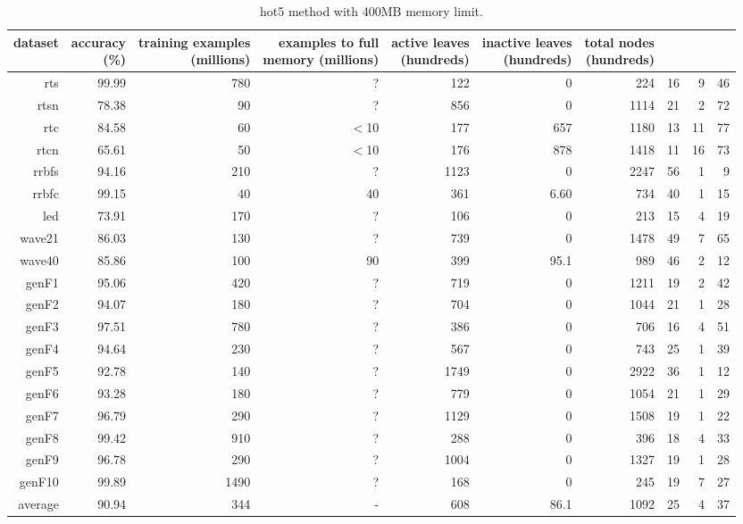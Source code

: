 \clearpage
\begin{table}
\caption{{\sc hot5} method with 400MB memory limit.}
\label{tab:hot5-400MB}
\centering
\begin{tabular}{|r|r|r|r|r|r|r|r|r|r|}
\hline
dataset	&
\rotatebox{90}{\parbox{9em}{accuracy\\(\%)}} &
\rotatebox{90}{\parbox{9em}{training examples\\(millions)}} &
\rotatebox{90}{\parbox{9em}{examples to full\\memory (millions)}} &
\rotatebox{90}{\parbox{9em}{active leaves\\(hundreds)}} &
\rotatebox{90}{\parbox{9em}{inactive leaves\\(hundreds)}} &
\rotatebox{90}{\parbox{9em}{total nodes\\(hundreds)}} &
\rotatebox{90}{\parbox{9em}{tree depth}}	&
\rotatebox{90}{\parbox{9em}{training speed (\%)}} &
\rotatebox{90}{\parbox{9em}{prediction speed (\%)}} \\
\hline
{\sc rts} & 99.99 & 780 & ? & 122 & 0 & 224 & 16 & 9 & 46 \\
{\sc rtsn} & 78.38 & 90 & ? & 856 & 0 & 1114 & 21 & 2 & 72 \\
{\sc rtc} & 84.58 & 60 & $<$10 & 177 & 657 & 1180 & 13 & 11 & 77 \\
{\sc rtcn} & 65.61 & 50 & $<$10 & 176 & 878 & 1418 & 11 & 16 & 73 \\
{\sc rrbfs} & 94.16 & 210 & ? & 1123 & 0 & 2247 & 56 & 1 & 9 \\
{\sc rrbfc} & 99.15 & 40 & 40 & 361 & 6.60 & 734 & 40 & 1 & 15 \\
{\sc led} & 73.91 & 170 & ? & 106 & 0 & 213 & 15 & 4 & 19 \\
{\sc wave21} & 86.03 & 130 & ? & 739 & 0 & 1478 & 49 & 7 & 65 \\
{\sc wave40} & 85.86 & 100 & 90 & 399 & 95.1 & 989 & 46 & 2 & 12 \\
{\sc genF1} & 95.06 & 420 & ? & 719 & 0 & 1211 & 19 & 2 & 42 \\
{\sc genF2} & 94.07 & 180 & ? & 704 & 0 & 1044 & 21 & 1 & 28 \\
{\sc genF3} & 97.51 & 780 & ? & 386 & 0 & 706 & 16 & 4 & 51 \\
{\sc genF4} & 94.64 & 230 & ? & 567 & 0 & 743 & 25 & 1 & 39 \\
{\sc genF5} & 92.78 & 140 & ? & 1749 & 0 & 2922 & 36 & 1 & 12 \\
{\sc genF6} & 93.28 & 180 & ? & 779 & 0 & 1054 & 21 & 1 & 29 \\
{\sc genF7} & 96.79 & 290 & ? & 1129 & 0 & 1508 & 19 & 1 & 22 \\
{\sc genF8} & 99.42 & 910 & ? & 288 & 0 & 396 & 18 & 4 & 33 \\
{\sc genF9} & 96.78 & 290 & ? & 1004 & 0 & 1327 & 19 & 1 & 28 \\
{\sc genF10} & 99.89 & 1490 & ? & 168 & 0 & 245 & 19 & 7 & 27 \\
\hline
average & 90.94 & 344 &  -  & 608 & 86.1 & 1092 & 25 & 4 & 37 \\
\hline
\end{tabular}
\end{table}
